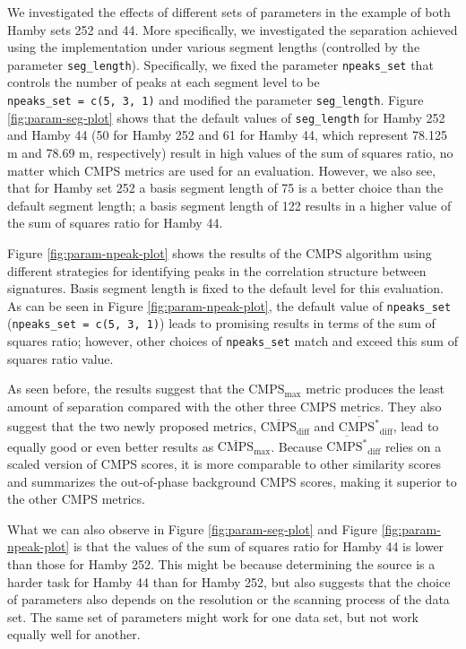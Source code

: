 We investigated the effects of different sets of parameters in the example of both Hamby sets 252 and 44.
More specifically, we investigated the separation achieved using the  implementation under various segment lengths (controlled by the parameter \texttt{seg\_length}). Specifically, we fixed the parameter \texttt{npeaks\_set} that controls the number of peaks at each segment level to be \texttt{npeaks\_set\ =\ c(5,\ 3,\ 1)} and modified the parameter \texttt{seg\_length}.
Figure \ref{fig:param-seg-plot} shows that the default values of \texttt{seg\_length} for Hamby 252 and Hamby 44 (50 for Hamby 252 and 61 for Hamby 44, which represent 78.125 \textmu m and 78.69 \textmu m, respectively) result in high values of the sum of squares ratio, no matter which CMPS metrics are used for an evaluation.
However, we also see, that for Hamby set 252 a basis segment length of 75 is a better choice than the default segment length; a basis segment length of 122 results in a higher value of the sum of squares ratio for Hamby 44.

Figure \ref{fig:param-npeak-plot} shows the results of the CMPS algorithm using different strategies for identifying peaks in the correlation structure between signatures. Basis segment length is fixed to the default level for this evaluation.
As can be seen in Figure \ref{fig:param-npeak-plot}, the default value of \texttt{npeaks\_set} (\texttt{npeaks\_set\ =\ c(5,\ 3,\ 1)}) leads to promising results in terms of the sum of squares ratio; however, other choices of \texttt{npeaks\_set} match and exceed this sum of squares ratio value.

As seen before, the results suggest that the \(\mathrm{CMPS_{max}}\) metric produces the least amount of separation compared with the other three CMPS metrics.
They also suggest that the two newly proposed metrics, \(\mathrm{\overline{CMPS}_{diff}}\) and \(\mathrm{\overline{CMPS^*}_{diff}}\), lead to equally good or even better results as \(\mathrm{\overline{CMPS}_{max}}\).
Because \(\mathrm{\overline{CMPS^*}_{diff}}\) relies on a scaled version of CMPS scores, it is more comparable to other similarity scores and summarizes the out-of-phase background CMPS scores, making it superior to the other CMPS metrics.

What we can also observe in Figure \ref{fig:param-seg-plot} and Figure \ref{fig:param-npeak-plot} is that the values of the sum of squares ratio for Hamby 44 is lower than those for Hamby 252.
This might be because determining the source is a harder task for Hamby 44 than for Hamby 252, but also suggests that the choice of parameters also depends on the resolution or the scanning process of the data set.
The same set of parameters might work for one data set, but not work equally well for another.

